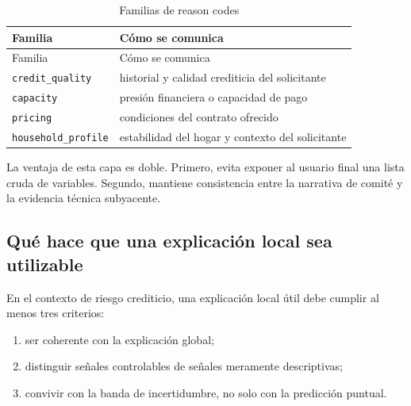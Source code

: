 \documentclass[
  spanish,
  11pt,
  letterpaper,
]{scrbook}
\providecommand{\tightlist}{%
  \setlength{\itemsep}{0pt}\setlength{\parskip}{0pt}}
\theoremstyle{plain}
\theoremstyle{remark}
\begin{document}
\begin{longtable}[]{@{}
  >{\raggedright\arraybackslash}p{}
  >{\raggedright\arraybackslash}p{}@{}}
\caption{Familias de reason
codes}\label{tbl-reason-families}\tabularnewline
\toprule\noalign{}
\begin{minipage}[b]{\linewidth}\raggedright
Familia
\end{minipage} & \begin{minipage}[b]{\linewidth}\raggedright
Cómo se comunica
\end{minipage} \\
\midrule\noalign{}
\endfirsthead
\toprule\noalign{}
\begin{minipage}[b]{\linewidth}\raggedright
Familia
\end{minipage} & \begin{minipage}[b]{\linewidth}\raggedright
Cómo se comunica
\end{minipage} \\
\midrule\noalign{}
\endhead
\bottomrule\noalign{}
\endlastfoot
\texttt{credit\_quality} & historial y calidad crediticia del
solicitante \\
\texttt{capacity} & presión financiera o capacidad de pago \\
\texttt{pricing} & condiciones del contrato ofrecido \\
\texttt{household\_profile} & estabilidad del hogar y contexto del
solicitante \\
\end{longtable}

La ventaja de esta capa es doble. Primero, evita exponer al usuario
final una lista cruda de variables. Segundo, mantiene consistencia entre
la narrativa de comité y la evidencia técnica subyacente.

\subsection{Qué hace que una explicación local sea
utilizable}\label{quuxe9-hace-que-una-explicaciuxf3n-local-sea-utilizable}

En el contexto de riesgo crediticio, una explicación local útil debe
cumplir al menos tres criterios:

\begin{enumerate}
\def\labelenumi{\arabic{enumi}.}
\tightlist
\item
  ser coherente con la explicación global;
\item
  distinguir señales controlables de señales meramente descriptivas;
\item
  convivir con la banda de incertidumbre, no solo con la predicción
  puntual.
\end{enumerate}
\end{document}
